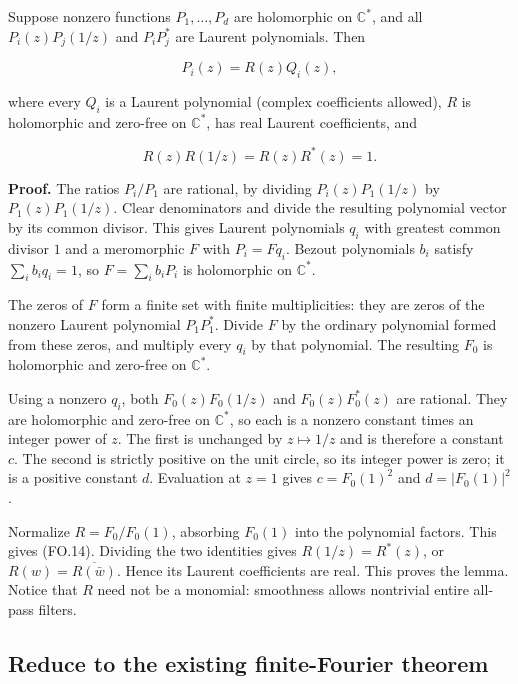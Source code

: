 \begin{lemma}\label{pass1:finite_orbit_resonance-3} Suppose nonzero functions \(P_1,\ldots,P_d\) are holomorphic on \(\mathbb C^*\), and all \(P_i(z)P_j(1/z)\) and \(P_iP_j^*\) are Laurent polynomials. Then
\end{lemma}

\[
 P_i(z)=R(z)Q_i(z),
\tag{FO.13}
\]

where every \(Q_i\) is a Laurent polynomial (complex coefficients allowed), \(R\) is holomorphic and zero-free on \(\mathbb C^*\), has real Laurent coefficients, and

\[
 R(z)R(1/z)=R(z)R^*(z)=1.
\tag{FO.14}
\]

\textbf{Proof.} The ratios \(P_i/P_1\) are rational, by dividing \(P_i(z)P_1(1/z)\) by \(P_1(z)P_1(1/z)\). Clear denominators and divide the resulting polynomial vector by its common divisor. This gives Laurent polynomials \(q_i\) with greatest common divisor \(1\) and a meromorphic \(F\) with \(P_i=Fq_i\). Bezout polynomials \(b_i\) satisfy \(\sum_i b_iq_i=1\), so \(F=\sum_i b_iP_i\) is holomorphic on \(\mathbb C^*\).

The zeros of \(F\) form a finite set with finite multiplicities: they are zeros of the nonzero Laurent polynomial \(P_1P_1^*\). Divide \(F\) by the ordinary polynomial formed from these zeros, and multiply every \(q_i\) by that polynomial. The resulting \(F_0\) is holomorphic and zero-free on \(\mathbb C^*\).

Using a nonzero \(q_i\), both \(F_0(z)F_0(1/z)\) and \(F_0(z)F_0^*(z)\) are rational. They are holomorphic and zero-free on \(\mathbb C^*\), so each is a nonzero constant times an integer power of \(z\). The first is unchanged by \(z\mapsto1/z\) and is therefore a constant \(c\). The second is strictly positive on the unit circle, so its integer power is zero; it is a positive constant \(d\). Evaluation at \(z=1\) gives \(c=F_0(1)^2\) and \(d=|F_0(1)|^2\).

Normalize \(R=F_0/F_0(1)\), absorbing \(F_0(1)\) into the polynomial factors. This gives (FO.14). Dividing the two identities gives \(R(1/z)=R^*(z)\), or \(R(w)=\overline{R(\bar w)}\). Hence its Laurent coefficients are real. This proves the lemma. Notice that \(R\) need not be a monomial: smoothness allows nontrivial entire all-pass filters.

\hypertarget{reduce-to-the-existing-finite-fourier-theorem}{%
\subsection{Reduce to the existing finite-Fourier theorem}\label{reduce-to-the-existing-finite-fourier-theorem}}


